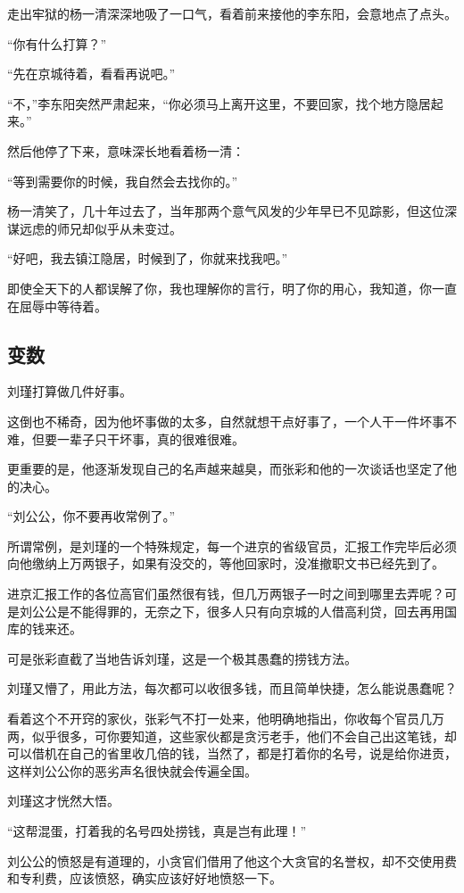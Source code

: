 \begin{multicols}{\theparacolNo}
走出牢狱的杨一清深深地吸了一口气，看着前来接他的李东阳，会意地点了点头。

“你有什么打算？”

“先在京城待着，看看再说吧。”

“不，”李东阳突然严肃起来，“你必须马上离开这里，不要回家，找个地方隐居起来。”

然后他停了下来，意味深长地看着杨一清：

“等到需要你的时候，我自然会去找你的。”

杨一清笑了，几十年过去了，当年那两个意气风发的少年早已不见踪影，但这位深谋远虑的师兄却似乎从未变过。

“好吧，我去镇江隐居，时候到了，你就来找我吧。”

即使全天下的人都误解了你，我也理解你的言行，明了你的用心，我知道，你一直在屈辱中等待着。

\subsection{变数}
刘瑾打算做几件好事。

这倒也不稀奇，因为他坏事做的太多，自然就想干点好事了，一个人干一件坏事不难，但要一辈子只干坏事，真的很难很难。

更重要的是，他逐渐发现自己的名声越来越臭，而张彩和他的一次谈话也坚定了他的决心。

“刘公公，你不要再收常例了。”

所谓常例，是刘瑾的一个特殊规定，每一个进京的省级官员，汇报工作完毕后必须向他缴纳上万两银子，如果有没交的，等他回家时，没准撤职文书已经先到了。

进京汇报工作的各位高官们虽然很有钱，但几万两银子一时之间到哪里去弄呢？可是刘公公是不能得罪的，无奈之下，很多人只有向京城的人借高利贷，回去再用国库的钱来还。

可是张彩直截了当地告诉刘瑾，这是一个极其愚蠢的捞钱方法。

刘瑾又懵了，用此方法，每次都可以收很多钱，而且简单快捷，怎么能说愚蠢呢？

看着这个不开窍的家伙，张彩气不打一处来，他明确地指出，你收每个官员几万两，似乎很多，可你要知道，这些家伙都是贪污老手，他们不会自己出这笔钱，却可以借机在自己的省里收几倍的钱，当然了，都是打着你的名号，说是给你进贡，这样刘公公你的恶劣声名很快就会传遍全国。

刘瑾这才恍然大悟。

“这帮混蛋，打着我的名号四处捞钱，真是岂有此理！”

刘公公的愤怒是有道理的，小贪官们借用了他这个大贪官的名誉权，却不交使用费和专利费，应该愤怒，确实应该好好地愤怒一下。


\end{multicols}
